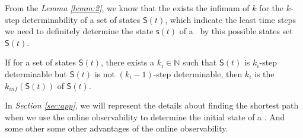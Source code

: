 From the {\em Lemma \ref{lemm:2}}, we know that the exists the infimum of $k$ for the $k$-step determinability of a set of states $\mathsf{S}(t)$, which indicate the least time steps we need to definitely determine the state $\mathsf{s}(t)$ of a \BCN\ by this possible states set $\mathsf{S}(t)$.
\begin{definition} 
If for a set of states $\mathsf{S}(t)$, there exists a $k_i\in \mathbb{N}$ such that $\mathsf{S}(t)$ is $k_i$-step determinable but $\mathsf{S}(t)$ is not $(k_{i}-1)$-step determinable, then $k_{i}$ is the $k_{inf}(\mathsf{S}(t))$ of $\mathsf{S}(t)$.
\end{definition}

In {\em Section \ref{sec:app}}, we will represent the details about finding the shortest path when we use the online observability to determine the initial state of a \BCN. And some other some other advantages of the online observability.



